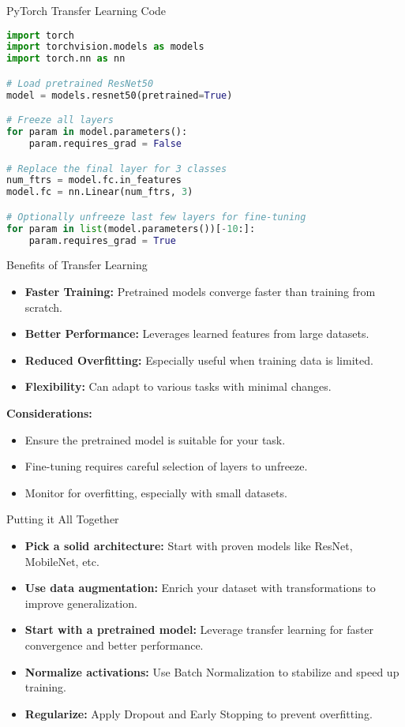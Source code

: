 \begin{frame}[fragile]{PyTorch Transfer Learning Code}
    \begin{lstlisting}[language=Python]
import torch
import torchvision.models as models
import torch.nn as nn

# Load pretrained ResNet50
model = models.resnet50(pretrained=True)

# Freeze all layers
for param in model.parameters():
    param.requires_grad = False

# Replace the final layer for 3 classes
num_ftrs = model.fc.in_features
model.fc = nn.Linear(num_ftrs, 3)

# Optionally unfreeze last few layers for fine-tuning
for param in list(model.parameters())[-10:]:
    param.requires_grad = True
    \end{lstlisting}
\end{frame}


\begin{frame}{Benefits of Transfer Learning}
    \begin{itemize}
        \item \textbf{Faster Training:} Pretrained models converge faster than training from scratch.
        \item \textbf{Better Performance:} Leverages learned features from large datasets.
        \item \textbf{Reduced Overfitting:} Especially useful when training data is limited.
        \item \textbf{Flexibility:} Can adapt to various tasks with minimal changes.
    \end{itemize}
    \vspace{0.5cm}
    \textbf{Considerations:}
    \begin{itemize}
        \item Ensure the pretrained model is suitable for your task.
        \item Fine-tuning requires careful selection of layers to unfreeze.
        \item Monitor for overfitting, especially with small datasets.
    \end{itemize}
\end{frame}

\begin{frame}{Putting it All Together}
    \begin{itemize}
        \item \textbf{Pick a solid architecture:} Start with proven models like ResNet, MobileNet, etc.
        \item \textbf{Use data augmentation:} Enrich your dataset with transformations to improve generalization.
        \item \textbf{Start with a pretrained model:} Leverage transfer learning for faster convergence and better performance.
        \item \textbf{Normalize activations:} Use Batch Normalization to stabilize and speed up training.
        \item \textbf{Regularize:} Apply Dropout and Early Stopping to prevent overfitting.
    \end{itemize}
\end{frame}